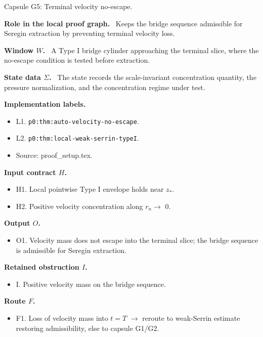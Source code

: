 \documentclass[11pt]{amsart}
\newcommand{\capsulefield}[1]{\par\smallskip\noindent\textbf{#1.}\ }
\begin{document}
\begin{proofcapsule}{Capsule G5: Terminal velocity no-escape.}
  \capsulefield{Role in the local proof graph}
  Keeps the bridge sequence admissible for Seregin extraction by preventing terminal velocity loss.

  \capsulefield{Window \(W\)}
A Type I bridge cylinder approaching the terminal slice, where the no-escape condition is tested before extraction.

  \capsulefield{State data \(\Sigma\)}
The state records the scale-invariant concentration quantity, the pressure normalization, and the concentration regime under test.

  \capsulefield{Implementation labels}
  \begin{itemize}[leftmargin=1.8em]
  \item L1. \texttt{p0:thm:auto-velocity-no-escape}.
  \item L2. \texttt{p0:thm:local-weak-serrin-typeI}.
  \item Source: proof\_setup.tex.
  \end{itemize}

  \capsulefield{Input contract \(H\)}
  \begin{itemize}[leftmargin=1.8em]
  \item H1. Local pointwise Type I envelope holds near $z_*$.
  \item H2. Positive velocity concentration along $r_n \to$ 0.
  \end{itemize}

  \capsulefield{Output \(O\)}
  \begin{itemize}[leftmargin=1.8em]
  \item O1. Velocity mass does not escape into the terminal slice; the bridge sequence is admissible for Seregin extraction.
  \end{itemize}

  \capsulefield{Retained obstruction \(I\)}
  \begin{itemize}[leftmargin=1.8em]
  \item I. Positive velocity mass on the bridge sequence.
  \end{itemize}

  \capsulefield{Route \(F\)}
  \begin{itemize}[leftmargin=1.8em]
  \item F1. Loss of velocity mass into \(t=T\) $\to$ reroute to weak-Serrin estimate restoring admissibility, else to capsule G1/G2.
  \end{itemize}


\end{proofcapsule}
\end{document}
